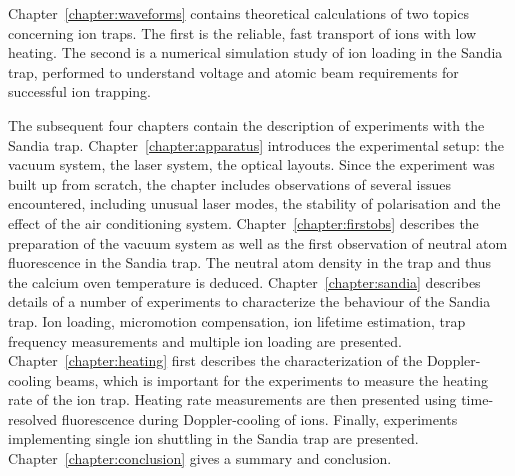 Chapter~\ref{chapter:waveforms} contains theoretical calculations of two topics concerning ion traps. The first is the reliable, fast transport of ions with low heating. The second is a numerical simulation study of ion loading in the Sandia trap, performed to understand voltage and atomic beam requirements for successful ion trapping.

The subsequent four chapters contain the description of experiments with the Sandia trap. Chapter~\ref{chapter:apparatus} introduces the experimental setup: the vacuum system, the laser system, the optical layouts. Since the experiment was built up from scratch, the chapter includes observations of several issues encountered, including unusual laser modes, the stability of polarisation and the effect of the air conditioning system. Chapter~\ref{chapter:firstobs} describes the preparation of the vacuum system as well as the first observation of neutral atom fluorescence in the Sandia trap. The neutral atom density in the trap  and thus the calcium oven temperature is deduced. Chapter~\ref{chapter:sandia} describes details of a number of experiments to characterize the behaviour of the Sandia trap. Ion loading, micromotion compensation, ion lifetime estimation, trap frequency measurements and multiple ion loading are presented. Chapter~\ref{chapter:heating} first describes the characterization of the Doppler-cooling beams, which is important for the experiments to measure the heating rate of the ion trap. Heating rate measurements are then presented using time-resolved fluorescence during Doppler-cooling of ions. Finally, experiments implementing single ion shuttling in the Sandia trap are presented. Chapter~\ref{chapter:conclusion} gives a summary and conclusion.


